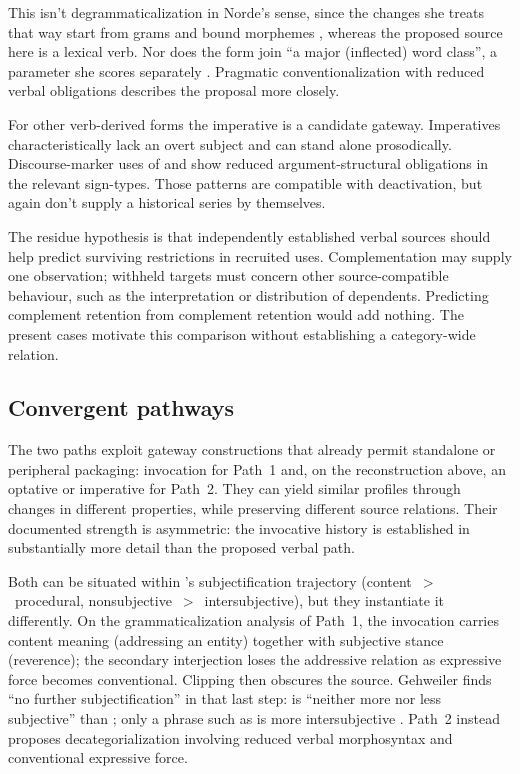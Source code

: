 \documentclass[12pt]{article}
\begin{document}
This isn't degrammaticalization in Norde's sense, since the changes she treats that way start from grams and bound morphemes \citep[cf.][186]{norde2009}, whereas the proposed source here is a lexical verb. Nor does the form join \enquote{a major (inflected) word class}, a parameter she scores separately \citep[192]{norde2009}. Pragmatic conventionalization with reduced verbal obligations describes the proposal more closely.

For other verb-derived forms the imperative is a candidate gateway. Imperatives characteristically lack an overt subject and can stand alone prosodically. Discourse-marker uses of  and  show reduced argument-structural obligations in the relevant sign-types. Those patterns are compatible with deactivation, but again don't supply a historical series by themselves.

The residue hypothesis is that independently established verbal sources should help predict surviving restrictions in recruited uses. Complementation may supply one observation; withheld targets must concern other source-compatible behaviour, such as the interpretation or distribution of dependents. Predicting complement retention from complement retention would add nothing. The present cases motivate this comparison without establishing a category-wide relation.

\subsection{Convergent pathways}

The two paths exploit gateway constructions that already permit standalone or peripheral packaging: invocation for Path~1 and, on the reconstruction above, an optative or imperative for Path~2. They can yield similar profiles through changes in different properties, while preserving different source relations. Their documented strength is asymmetric: the invocative history is established in substantially more detail than the proposed verbal path.

Both can be situated within \textcite[40]{TraugottDasher2002}'s subjectification trajectory (content~$>$~procedural, nonsubjective~$>$~intersubjective), but they instantiate it differently. On the grammaticalization analysis of Path~1, the invocation carries content meaning (addressing an entity) together with subjective stance (reverence); the secondary interjection loses the addressive relation as expressive force becomes conventional. Clipping then obscures the source. Gehweiler finds \enquote{no further subjectification} in that last step:  is \enquote{neither more nor less subjective} than ; only a phrase such as  is more intersubjective \citep[88--89]{gehweiler2008}. Path~2 instead proposes decategorialization involving reduced verbal morphosyntax and conventional expressive force.
\end{document}
